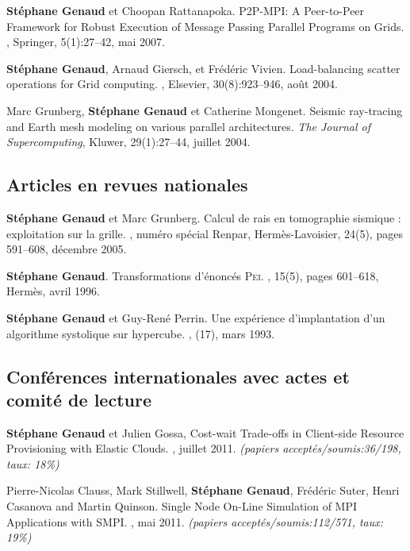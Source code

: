 \documentclass[11pt]{article}
\begin{document}
\begin{thebibliography}{99}
\textbf{Stéphane Genaud} et Choopan Rattanapoka.
\newblock P2P-MPI: A Peer-to-Peer Framework for Robust Execution of Message 
Passing Parallel Programs on Grids.
, Springer, 5(1):27--42, mai 2007.


\textbf{Stéphane Genaud}, Arnaud Giersch, et Frédéric Vivien.
\newblock Load-balancing scatter operations for Grid computing.
, Elsevier, 30(8):923--946, août 2004.

Marc Grunberg, \textbf{Stéphane Genaud} et Catherine Mongenet.
\newblock Seismic ray-tracing and Earth mesh modeling on various parallel
  architectures.
\newblock 
{\em The Journal of Supercomputing}, Kluwer, 29(1):27--44, juillet 2004.


\subsection*{Articles en revues nationales}
\textbf{Stéphane Genaud} et Marc Grunberg. 
\newblock  Calcul de rais en tomographie sismique : exploitation sur la grille.
, numéro spécial Renpar, 
Hermès-Lavoisier, 24(5), pages 591--608, décembre 2005.

\textbf{Stéphane Genaud}.
\newblock Transformations d'énoncés \textsc{Pei}.
, 15(5), pages 601--618, 
Hermès, avril 1996.

\textbf{Stéphane Genaud} et Guy-René Perrin.
\newblock Une expérience d'implantation d'un algorithme systolique sur
  hypercube.
,
  (17), mars 1993.


\subsection*{Conférences internationales avec actes et comité de lecture}

\newblock \textbf{Stéphane Genaud} et Julien Gossa,
\newblock Cost-wait Trade-offs in Client-side Resource Provisioning with 
Elastic Clouds.
, juillet 2011.
\newblock \small{\textit{(papiers acceptés/soumis{:}36/198, taux: 18\%)}}


\newblock Pierre-Nicolas Clauss, Mark Stillwell, \textbf{Stéphane Genaud}, 
Fr\'ed\'eric Suter, Henri Casanova and  Martin Quinson.
\newblock Single Node On-Line Simulation of MPI Applications with SMPI.
, mai 2011.
\newblock \small{\textit{(papiers acceptés/soumis{:}112/571, taux: 19\%)}}


\end{thebibliography}
\end{document}
